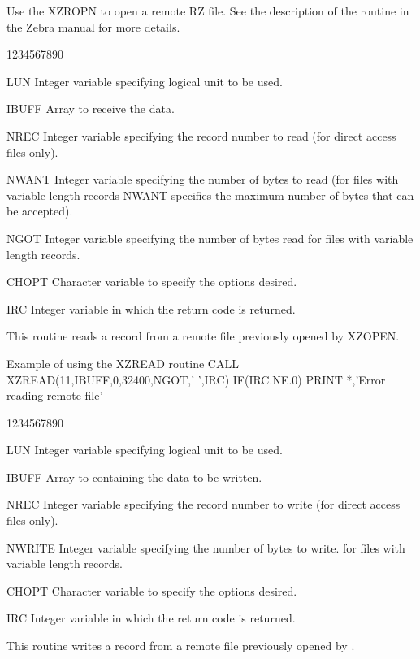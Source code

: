 Use the XZROPN to open a remote RZ file. See the description of
the  routine in the Zebra manual for more details.
\begin{DLtt}{1234567890}
\item[LUN]Integer variable specifying logical unit to be used.
\item[IBUFF]Array to receive the data.
\item[NREC]Integer variable specifying the record number to read
(for direct access files only).
\item[NWANT]Integer variable specifying the number of bytes to read
(for files with variable length records NWANT specifies the
maximum number of bytes that can be accepted).
\item[NGOT]Integer variable specifying the number of bytes read
for files with variable length records.
\item[CHOPT]Character variable to specify the options desired.
\item[IRC]Integer variable in which the return code is returned.
\end{DLtt}
\par
This routine reads a record from a remote file
previously opened by XZOPEN.
\begin{XMPt}{Example of using the XZREAD routine}
      CALL XZREAD(11,IBUFF,0,32400,NGOT,' ',IRC)
      IF(IRC.NE.0) PRINT *,'Error reading remote file'
\end{XMPt}
\begin{DLtt}{1234567890}
\item[LUN]Integer variable specifying logical unit to be used.
\item[IBUFF]Array to containing the data to be written.
\item[NREC]Integer variable specifying the record number to write
(for direct access files only).
\item[NWRITE]Integer variable specifying the number of bytes to write.
for files with variable length records.
\item[CHOPT]Character variable to specify the options desired.
\item[IRC]Integer variable in which the return code is returned.
\end{DLtt}
\par
This routine writes a record from a remote file
previously opened by .
